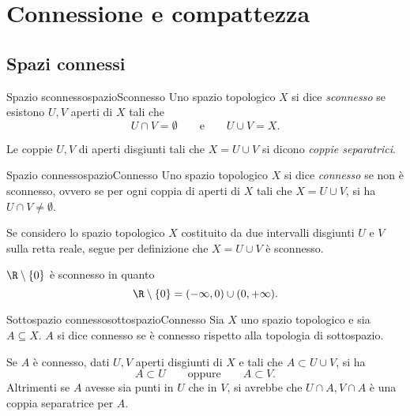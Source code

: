 %
%
\chapter{Connessione e compattezza}
\section{Spazi connessi}

\begin{defn}{Spazio sconnesso}{spazioSconnesso}
	Uno spazio topologico \(X\) si dice \emph{sconnesso} se esistono \(U,V\) aperti di \(X\) tali che
	\[
		U \cap V = \emptyset \qquad\text{e}\qquad U \cup V = X.
	\]
\end{defn}

\begin{notz}
	Le coppie \(U,V\) di aperti disgiunti tali che \(X=U \cup V\) si dicono \emph{coppie separatrici}.
\end{notz}

\begin{defn}{Spazio connesso}{spazioConnesso}
	Uno spazio topologico \(X\) si dice \emph{connesso} se non è sconnesso, ovvero se per ogni coppia di aperti di \(X\) tali che \(X=U\cup V\), si ha \(U \cap V \neq \emptyset\).
\end{defn}

\begin{ese}
	Se considero lo spazio topologico \(X\) costituito da due intervalli disgiunti \(U\) e \(V\) sulla retta reale, segue per definizione che \(X= U\cup V\) è sconnesso.
\end{ese}

\begin{ese}
	\(\R\setminus \{0\}\) è sconnesso in quanto
	\[
		\R\setminus\{0\} = (-\infty,0) \cup (0,+\infty).
	\]
\end{ese}

\begin{defn}{Sottospazio connesso}{sottospazioConnesso}
	Sia \(X\) uno spazio topologico e sia \(A\subseteq X\).
	\(A\) si dice connesso se è connesso rispetto alla topologia di sottospazio.
\end{defn}

\begin{oss}
	Se \(A\) è connesso, dati \(U,V\) aperti disgiunti di \(X\) e tali che \(A\subset U \cup V\), si ha
	\[
		A \subset U \qquad\text{oppure}\qquad A \subset V.
	\]
	Altrimenti se \(A\) avesse sia punti in \(U\) che in \(V\), si avrebbe che \(U\cap A, V\cap A\) è una coppia separatrice per \(A\).
\end{oss}

